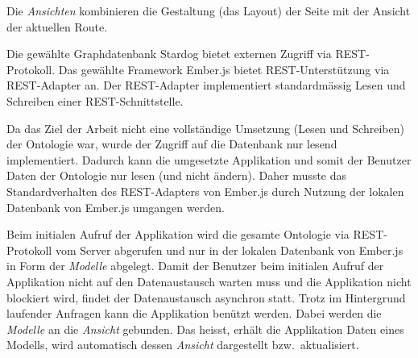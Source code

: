 Die \textit{Ansichten} kombinieren die Gestaltung (das Layout) der Seite mit der Ansicht der aktuellen Route.

Die gewählte Graphdatenbank Stardog bietet externen Zugriff via REST-Protokoll. Das gewählte Framework Ember.js bietet REST-Unterstützung via REST-Adapter an. Der REST-Adapter implementiert standardmässig Lesen und Schreiben einer REST-Schnittstelle.

Da das Ziel der Arbeit nicht eine vollständige Umsetzung (Lesen und Schreiben) der Ontologie war, wurde der Zugriff auf die Datenbank nur lesend implementiert. Dadurch kann die umgesetzte Applikation und somit der Benutzer Daten der Ontologie nur lesen (und nicht ändern). Daher musste das Standardverhalten des REST-Adapters von Ember.js durch Nutzung der lokalen Datenbank von Ember.js umgangen werden.

Beim initialen Aufruf der Applikation wird die gesamte Ontologie via REST-Protokoll vom Server abgerufen und nur in der lokalen Datenbank von Ember.js in Form der \textit{Modelle} abgelegt. Damit der Benutzer beim initialen Aufruf der Applikation nicht auf den Datenaustausch warten muss und die Applikation nicht blockiert wird, findet der Datenaustausch asynchron statt. Trotz im  Hintergrund laufender Anfragen kann die Applikation benützt werden. Dabei werden die \textit{Modelle} an die \textit{Ansicht} gebunden. Das heisst, erhält die Applikation Daten eines Modells, wird automatisch dessen \textit{Ansicht} dargestellt bzw.\ aktualisiert.
